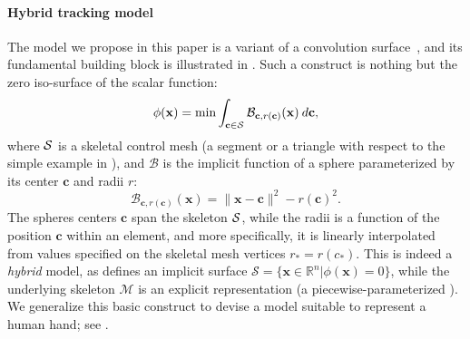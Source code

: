 \paragraph{Hybrid tracking model}
The model we propose in this paper is a variant of a convolution surface~\cite{bloomenthal1991convolution}, and its fundamental building block is illustrated in . Such a construct is nothing but the zero iso-surface of the scalar function:
\begin{equation}
\phi(\mathbf{x}) = \min \int_{\mathbf{c} \in \mathcal{S}} \mathcal{B}_{\mathbf{c}, r(\mathbf{c})}(\mathbf{x}) \: d\mathbf{c},
\label{eq:convsurf}
\end{equation}
where $\mathcal{S}$ is a skeletal control mesh (a segment or a triangle with respect to the simple example in ), and $\mathcal{B}$ is the implicit function of a sphere parameterized by its center $\mathbf{c}$ and radii $r$:
\begin{equation}
\mathcal{B}_{\mathbf{c}, r(\mathbf{c})}(\mathbf{x}) = \|\mathbf{x}-\mathbf{c}\|^2 - r(\mathbf{c})^2.
\end{equation}
The spheres centers $\mathbf{c}$ span the skeleton $\mathcal{S}$, while the radii is a function of the position $\mathbf{c}$ within an element, and more specifically, it is linearly interpolated from values specified on the skeletal mesh vertices $r_*=r(c_*)$. This is indeed a \emph{hybrid} model, as  defines an implicit surface $\mathcal{S} = \{\mathbf{x} \in \mathbb{R}^n | \phi(\mathbf{x})=0 \}$, while the underlying skeleton $\mathcal{M}$ is an explicit representation (a piecewise-parameterized ). We generalize this basic construct to devise a model suitable to represent a human hand; see .


